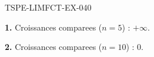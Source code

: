 \begin{corrige}{TSPE-LIMFCT-EX-040}

\textbf{1.} Croissances comparees ($n=5$) : $\boxed{+\infty}$.

\textbf{2.} Croissances comparees ($n=10$) : $\boxed{0}$.

\end{corrige}
